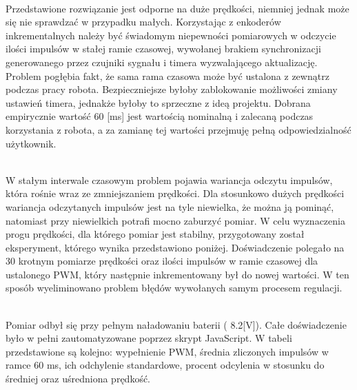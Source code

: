 \documentclass[eng,printmode]{mgr}
\begin{document}
\\Przedstawione rozwiązanie jest odporne na duże prędkości,  niemniej jednak może się nie sprawdzać w przypadku małych. Korzystając z enkoderów inkrementalnych należy być świadomym niepewności pomiarowych w odczycie ilości impulsów w stałej ramie czasowej, wywołanej brakiem synchronizacji generowanego przez czujniki sygnału i timera wyzwalającego aktualizację. Problem pogłębia fakt, że sama rama czasowa może być ustalona z zewnątrz podczas pracy robota. Bezpieczniejsze byłoby zablokowanie możliwości zmiany ustawień timera, jednakże byłoby to sprzeczne z ideą projektu. Dobrana empirycznie wartość 60 [ms] jest wartością nominalną i zalecaną podczas korzystania z robota, a za zamianę tej wartości przejmuję pełną odpowiedzialność użytkownik. 

\\W stałym interwale czasowym problem pojawia wariancja odczytu impulsów, która rośnie wraz ze zmniejszaniem prędkości. Dla stosunkowo dużych prędkości wariancja odczytanych impulsów jest na tyle niewielka, że można ją pominąć, natomiast przy niewielkich potrafi mocno zaburzyć pomiar. W celu wyznaczenia progu prędkości, dla którego pomiar jest stabilny, przygotowany został eksperyment, którego wynika przedstawiono poniżej. Doświadczenie polegało na 30 krotnym pomiarze prędkości oraz ilości impulsów w ramie czasowej dla ustalonego PWM, który następnie inkrementowany był do nowej wartości. W ten sposób wyeliminowano problem błędów wywołanych samym procesem regulacji. 

\\Pomiar odbył się przy pełnym naładowaniu baterii ( 8.2[V]). Całe doświadczenie było w pełni zautomatyzowane poprzez skrypt JavaScript. W tabeli przedstawione są kolejno: wypełnienie PWM, średnia zliczonych impulsów w ramce  60 ms, ich odchylenie standardowe, procent odcylenia w stosunku do średniej oraz uśredniona prędkość.
\end{document}

